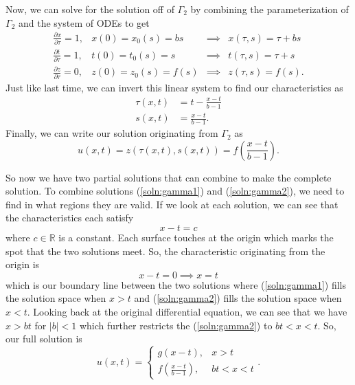 \documentclass[a4paper,12pt]{article}
\newcommand{\reals}{\mathbb{R}}
\newcommand{\abs}[1]{\left| #1 \right|}
\begin{document}
\begin{enumerate}[label = \textbf{(\alph*)}]
        Now, we can solve for the solution off of $ \Gamma_2 $ by combining the parameterization of $ \Gamma_2 $ and the system of ODEs to get
        \[
            \begin{array}{rccl}
                \frac{\partial x}{\partial \tau} = 1, & x(0) = x_0(s) = bs & \implies & x(\tau, s) = \tau + bs \\
                \frac{\partial t}{\partial \tau} = 1, & t(0) = t_0(s) = s & \implies & t(\tau, s) = \tau + s\\
                \frac{\partial z}{\partial \tau} = 0, & z(0) = z_0(s) = f(s) & \implies & z(\tau, s) = f(s).
            \end{array}
        \]
        Just like last time, we can invert this linear system to find our characteristics as
        \begin{align*}
            \tau(x,t) &= t - \frac{x - t}{b - 1} \\
            s(x,t) &= \frac{x - t}{b - 1}.
        \end{align*}
        Finally, we can write our solution originating from $ \Gamma_2 $ as
        \begin{equation}
            u(x,t) = z(\tau(x,t), s(x,t)) = f(\frac{x - t}{b - 1}). \label{soln:gamma2}
        \end{equation}
    
        So now we have two partial solutions that can combine to make the complete solution. To combine solutions (\ref{soln:gamma1}) and (\ref{soln:gamma2}), we need to find in what regions they are valid. If we look at each solution, we can see that the characteristics each satisfy
        \[
            x - t = c
        \]
        where $ c \in \reals $ is a constant. Each surface touches at the origin which marks the spot that the two solutions meet. So, the characteristic originating from the origin is
        \[
            x - t = 0 \implies x = t
        \]
        which is our boundary line between the two solutions where (\ref{soln:gamma1}) fills the solution space when $ x > t $ and (\ref{soln:gamma2}) fills the solution space when $ x < t $. Looking back at the original differential equation, we can see that we have $ x > bt $ for $ \abs{b} < 1 $ which further restricts the (\ref{soln:gamma2}) to $ bt < x < t $. So, our full solution is
        \begin{equation}
            u(x,t) = 
                \begin{cases}
                    g(x - t), & x > t \\
                    f(\frac{x - t}{b - 1}), & bt < x < t
                \end{cases}. \label{soln:full}
        \end{equation}
    

\end{enumerate}
\end{document}
